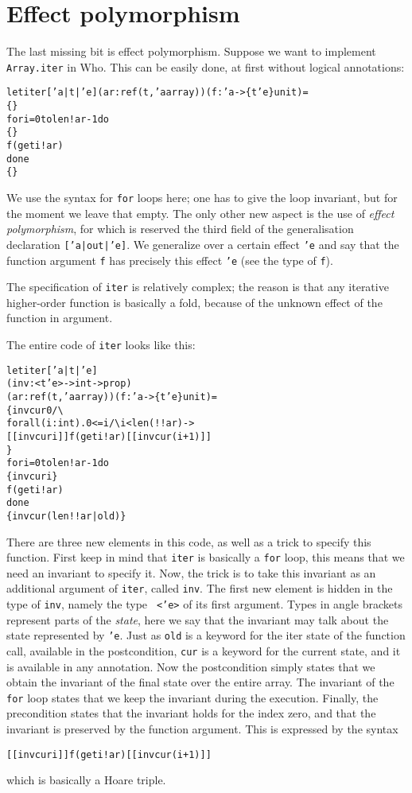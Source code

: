 \documentclass[a4paper]{scrreprt}
\newcommand{\who}{Who\xspace}
\begin{document}
\section{Effect polymorphism}
The last missing bit is effect polymorphism. Suppose we want to implement {\tt
Array.iter} in \who. This can be easily done, at first without logical
annotations:
\begin{alltt}
let iter ['a|t|'e] (ar : ref(t, 'a array)) (f : 'a ->\{t 'e\} unit)  =
  \{  \}
  for i = 0 to len !ar - 1 do 
    \{ \}
    f (get i !ar)
  done
  \{ \}
\end{alltt}
We use the syntax for {\tt for} loops here; one has to give the loop
invariant, but for the moment we leave that empty. The only other new aspect
is the use of {\em effect polymorphism}, for which is reserved the third field
of the generalisation declaration {\tt ['a|out|'e]}. We generalize over a
certain effect {\tt 'e} and say that the function argument {\tt f} has
precisely this effect {\tt 'e} (see the type of {\tt f}).

The specification of {\tt iter} is relatively complex; the reason is that any
iterative higher-order function is basically a fold, because of the unknown
effect of the function in argument.

The entire code of {\tt iter} looks like this:
\begin{alltt}
let iter ['a|t|'e] 
  (inv : <t 'e> -> int ->  prop) 
  (ar : ref(t, 'a array)) (f : 'a ->\{t 'e\} unit)  =
  \{ inv cur 0 \verb|/\| 
    forall (i:int). 0 <= i \verb|/\| i < len (!!ar) ->
    [[ inv cur i ]] f (get i !ar) [[inv cur (i+1)]]
  \}
  for i = 0 to len !ar - 1 do 
    \{ inv cur i \}
    f (get i !ar)
  done
  \{inv cur (len !!ar|old) \}
\end{alltt}
There are three new elements in this code, as well as a trick to specify this
function. First keep in mind that {\tt iter} is basically a {\tt for} loop,
this means that we need an invariant to specify it. Now, the trick is to take
this invariant as an additional argument of {\tt iter}, called {\tt inv}. The
first new element is hidden in the type of {\tt inv}, namely the type {\tt
<'e>} of its first argument. Types in angle brackets {\tt < >} represent parts
of the {\em state}, here we say that the invariant may talk about the state
represented by {\tt 'e}. Just as {\tt old} is a keyword for the iter state of
the function call, available in the postcondition, {\tt cur} is a keyword for
the current state, and it is available in any annotation.  Now the
postcondition simply states that we obtain the invariant of the final state
over the entire array. The invariant of the {\tt for} loop states that we keep
the invariant during the execution. Finally, the precondition states that the
invariant holds for the index zero, and that the invariant is preserved by the
function argument. This is expressed by the syntax
\begin{alltt}
    [[ inv cur i ]] f (get i !ar) [[inv cur (i+1)]]
\end{alltt}
which is basically a Hoare triple. 
\end{document}
